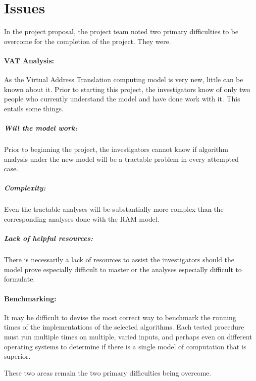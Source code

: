 \section{Issues}
  In the project proposal, the project team noted two primary
  difficulties to be overcome for the completion of the project. They were.
  \paragraph{VAT Analysis:} As the Virtual Address Translation computing model
  is very new, little can be known about it. Prior to starting this project,
  the investigators know of only two people who currently understand the model
  and have done work with it. This entails some things.
    \subparagraph{Will the model work:} Prior to beginning the project, the
    investigators cannot know if algorithm analysis under the new model will be
    a tractable problem in every attempted case.
    \subparagraph{Complexity:} Even the tractable analyses will be
    substantially more complex than the corresponding analyses done with the
    RAM model.
    \subparagraph{Lack of helpful resources:} There is necessarily a lack of
    resources to assist the investigators should the model prove especially
    difficult to master or the analyses especially difficult to formulate.
  \paragraph{Benchmarking:} It may be difficult to devise the most correct way
  to benchmark the running times of the implementations of the selected
  algorithms. Each tested procedure must run multiple times on multiple, varied
  inputs, and perhaps even on different operating systems to determine if
  there is a single model of computation that is superior.
  
  These two areas remain the two primary difficulties being overcome.